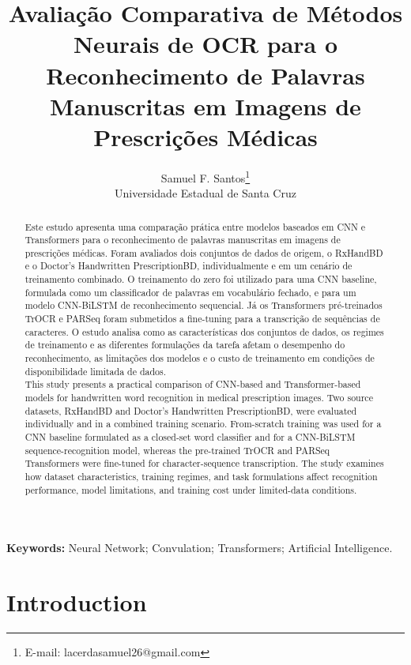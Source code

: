 \documentclass[11pt,a4paper]{article}
\title{Avaliação Comparativa de Métodos Neurais de OCR para o Reconhecimento de Palavras Manuscritas em Imagens de Prescrições Médicas}
\author{
  Samuel F. Santos\thanks{E-mail: lacerdasamuel26@gmail.com}
  \\ Universidade Estadual de Santa Cruz
}
\date{} %
\begin{document}
\maketitle

\begin{abstract}
Este estudo apresenta uma comparação prática entre modelos baseados em CNN e Transformers para o reconhecimento de palavras manuscritas em imagens de prescrições médicas. Foram avaliados dois conjuntos de dados de origem, o RxHandBD e o Doctor’s Handwritten PrescriptionBD, individualmente e em um cenário de treinamento combinado. O treinamento do zero foi utilizado para uma CNN baseline, formulada como um classificador de palavras em vocabulário fechado, e para um modelo CNN-BiLSTM de reconhecimento sequencial. Já os Transformers pré-treinados TrOCR e PARSeq foram submetidos a fine-tuning para a transcrição de sequências de caracteres. O estudo analisa como as características dos conjuntos de dados, os regimes de treinamento e as diferentes formulações da tarefa afetam o desempenho do reconhecimento, as limitações dos modelos e o custo de treinamento em condições de disponibilidade limitada de dados.\\

This study presents a practical comparison of CNN-based and Transformer-based models for handwritten word recognition in medical prescription images. Two source datasets, RxHandBD and Doctor’s Handwritten PrescriptionBD, were evaluated individually and in a combined training scenario. From-scratch training was used for a CNN baseline formulated as a closed-set word classifier and for a CNN-BiLSTM sequence-recognition model, whereas the pre-trained TrOCR and PARSeq Transformers were fine-tuned for character-sequence transcription. The study examines how dataset characteristics, training regimes, and task formulations affect recognition performance, model limitations, and training cost under limited-data conditions.
\end{abstract}

\noindent\textbf{Keywords:} Neural Network; Convulation; Transformers; Artificial Intelligence.

\section{Introduction}
\label{sec:introduction}



\end{document}
